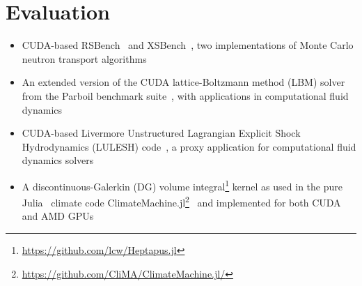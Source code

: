 
\section{Evaluation}
\label{sec:eval}





\begin{itemize}
    \item CUDA-based RSBench~\cite{RSBench} and XSBench~\cite{XSBench}, two implementations of Monte Carlo neutron transport algorithms
    \item An extended version of the CUDA lattice-Boltzmann method (LBM) solver from the Parboil benchmark suite~\cite{stratton2012parboil}, with applications in computational fluid dynamics
    \item CUDA-based Livermore Unstructured Lagrangian Explicit Shock Hydrodynamics (LULESH) code~\cite{LULESH2:changes}, a proxy application for computational fluid dynamics solvers%
    \item A discontinuous-Galerkin (DG) volume integral\footnote{\url{https://github.com/lcw/Heptapus.jl}}\cite{dg_wilcox} kernel as used in the pure Julia~\cite{bezanson2017julia} climate code ClimateMachine.jl\footnote{\url{https://github.com/CliMA/ClimateMachine.jl/}}~\cite{clima2017} and implemented for both CUDA and AMD GPUs
\end{itemize}


